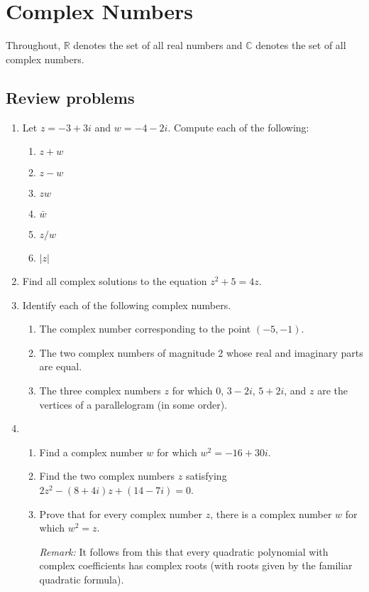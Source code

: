 \section{Complex Numbers}

Throughout, $\mathbb{R}$ denotes the set of all real numbers and $\mathbb{C}$ denotes the set of all complex numbers.

\subsection{Review problems}

\begin{enumerate}
\item Let $z = -3 + 3i$ and $w = -4 - 2i$. Compute each of the following:
\begin{enumerate}
\item $z + w$
\item $z - w$
\item $zw$
\item $\bar{w}$
\item $z/w$
\item $\lvert z\rvert$
\end{enumerate}
\item Find all complex solutions to the equation $z^2 + 5 = 4z$.
\item Identify each of the following complex numbers.
\begin{enumerate}
\item The complex number corresponding to the point $(-5,-1)$.
\item The two complex numbers of magnitude 2 whose real and imaginary parts are equal.
\item The three complex numbers $z$ for which $0$, $3 - 2i$, $5 + 2i$, and $z$ are the vertices of a parallelogram (in some order).
\end{enumerate}
\item \begin{enumerate}
\item Find a complex number $w$ for which $w^2 = -16 + 30i$.
\item Find the two complex numbers $z$ satisfying $2z^2 - (8 + 4i)z + (14 - 7i) = 0$.
\item Prove that for every complex number $z$, there is a complex number $w$ for which $w^2 = z$.\par
\emph{Remark:} It follows from this that every quadratic polynomial with complex coefficients has complex roots (with roots given by the familiar quadratic formula).

\end{enumerate}
\end{enumerate}
